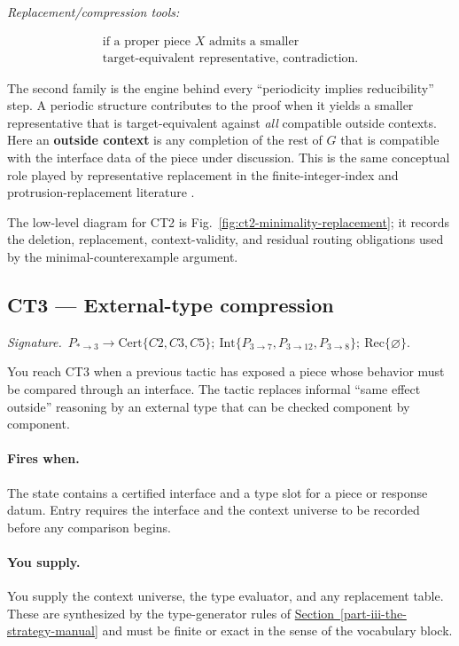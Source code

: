 \documentclass[
  11pt,
]{article}
\theoremstyle{definition}
\newcommand{\secref}[1]{\hyperref[#1]{Section~\ref*{#1}}}
\newcommand{\ctsignature}[1]{\par\noindent\emph{Signature.}\ #1\par\medskip}
\newcommand{\ctcert}[1]{\mathrm{Cert}\{#1\}}
\newcommand{\ctint}[1]{\mathrm{Int}\{#1\}}
\newcommand{\ctrec}[1]{\mathrm{Rec}\{#1\}}
\newcommand{\ctnone}{\varnothing}
\newcommand{\ctpar}[1]{\paragraph{#1.}}
\begin{document}
\emph{Replacement/compression tools:}

\[
\begin{gathered}
\text{if a proper piece } X \text{ admits a smaller}\\
\text{target-equivalent representative, contradiction.}
\end{gathered}
\]

The second family is the engine behind every ``periodicity implies
reducibility'' step. A periodic structure contributes to the proof when
it yields a smaller representative that is target-equivalent against
\emph{all} compatible outside contexts. Here an \textbf{outside context}
is any completion of the rest of \(G\) that is compatible with the
interface data of the piece under discussion. This is the same
conceptual role played by representative replacement in the
finite-integer-index and protrusion-replacement literature
\citep{bodlaender-etal-2009-meta-kernelization, kim-etal-2012-protrusion, garnero-etal-2013-explicit-kernels, jansen-wulms-2016-lower-bounds}.

The low-level diagram for CT2 is Fig.~\ref{fig:ct2-minimality-replacement};
it records the deletion, replacement, context-validity, and residual
routing obligations used by the minimal-counterexample argument.



\subsection{CT3 --- External-type compression}\label{ct:3}\label{boundaried-pieces-and-external-types}
\ctsignature{\(P_{\ast\to3}\to \ctcert{C2,C3,C5};\ \ctint{P_{3\to7},P_{3\to12},P_{3\to8}};\ \ctrec{\ctnone}\).}

You reach CT3 when a previous tactic has exposed a piece whose behavior
must be compared through an interface.  The tactic replaces informal
``same effect outside'' reasoning by an external type that can be
checked component by component.

\ctpar{Fires when}
The state contains a certified interface and a type slot for a piece or
response datum.  Entry requires the interface and the context universe to
be recorded before any comparison begins.

\ctpar{You supply}
You supply the context universe, the type evaluator, and any replacement
table.  These are synthesized by the type-generator rules of \secref{part-iii-the-strategy-manual} and
must be finite or exact in the sense of the vocabulary block.
\end{document}
